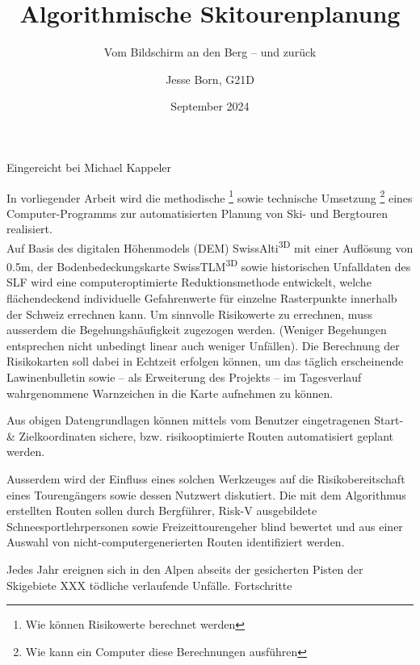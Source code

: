 \documentclass[a4paper]{scrarticle}
\makeatletter
\renewcommand{\maketitle}{%
																		 \begin{titlepage}
																			 \null\vfill %
																			 \begin{center}
																				 {\huge\@title\par}%
																				 \vspace{0.5cm} %
																				 {\large\@subtitle\par} %
																				 \vspace{2.5cm} %
																				 
																				 
																				 \vspace{1.5cm} %
																				 {\Large\@author\par}
																				 \vspace{0.5cm} %
																				 {\large\@date\par} %
																			 \end{center}
																			 \vfill %
																			 \begin{center}
																				Eingereicht bei Michael Kappeler
																			 \end{center}
																			 \@thanks %
																		 \end{titlepage}%
																	 }
\makeatother
\begin{document}
\title{\AKAfont\Huge\textcolor{AKSAcolor}{Algorithmische Skitourenplanung}}
\subtitle{Vom Bildschirm an den Berg – und zurück}
\author{Jesse Born, G21D}
\date{September 2024}


\maketitle
\clearpage


\tableofcontents
\clearpage
{}
In vorliegender Arbeit wird die methodische \footnote{Wie können Risikowerte berechnet werden} sowie technische Umsetzung \footnote{Wie kann ein Computer diese Berechnungen ausführen} eines Computer-Programms zur automatisierten Planung von Ski- und Bergtouren realisiert. 
\\
Auf Basis des digitalen Höhenmodels (DEM) SwissAlti\textsuperscript{3D} mit einer Auflösung von 0.5m, der Bodenbedeckungskarte SwissTLM\textsuperscript{3D} sowie historischen Unfalldaten des SLF wird eine computeroptimierte Reduktionsmethode entwickelt, welche flächendeckend individuelle Gefahrenwerte für einzelne Rasterpunkte innerhalb der Schweiz errechnen kann. Um sinnvolle Risikowerte zu errechnen, muss ausserdem die Begehungshäufigkeit zugezogen werden. (Weniger Begehungen entsprechen nicht unbedingt linear auch weniger Unfällen). Die Berechnung der Risikokarten soll dabei in Echtzeit erfolgen können, um das täglich erscheinende Lawinenbulletin sowie – als Erweiterung des Projekts – im Tagesverlauf wahrgenommene Warnzeichen in die Karte aufnehmen zu können.

Aus obigen Datengrundlagen können mittels vom Benutzer eingetragenen Start- \& Zielkoordinaten sichere, bzw. risikooptimierte Routen automatisiert geplant werden.

Ausserdem wird der Einfluss eines solchen Werkzeuges auf die Risikobereitschaft eines Tourengängers sowie dessen Nutzwert diskutiert. Die mit dem Algorithmus erstellten Routen sollen durch Bergführer, Risk-V ausgebildete Schneesportlehrpersonen sowie Freizeittourengeher blind bewertet und aus einer Auswahl von nicht-computergenerierten Routen identifiziert werden.
	

Jedes Jahr ereignen sich in den Alpen abseits der gesicherten Pisten der Skigebiete XXX tödliche verlaufende Unfälle. Fortschritte 
\clearpage
{}
\end{document}
